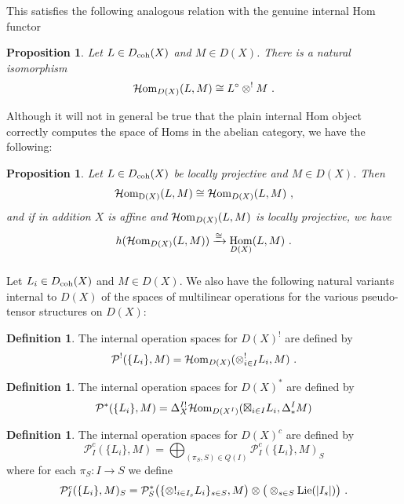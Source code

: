 \documentclass[11pt]{amsart}
\numberwithin{equation}{section}
\newtheorem{prop}[theo]{Proposition}
\theoremstyle{definition}
\newtheorem{defn}[theo]{Definition}
\newcommand{\mc}{\mathcal}
\DeclareMathOperator{\Hom}{Hom}
\newcommand{\Lie}{{\textup{Lie}}}
\newcommand{\Homi}{{\mc H\textup{om}}}
\newcommand{\coh}{{\textup{coh}}}
\newcommand{\0}{{\textbf{0}}}
\newcommand{\Dd}{{\textup{D}}}
\newcommand{\DD}{{D}}
\begin{document}
This satisfies the following analogous relation with the genuine internal Hom functor
\begin{prop}\label{inthomdescabprop} Let $L\in \DD_\coh(X)$ and $M\in \DD(X)$. There is a natural isomorphism
	\[\Homi_{\DD(X)}(L,M)  \cong L^{\circ} \otimes^! M \ . \]
\end{prop}

Although it will not in general be true that the plain internal Hom object correctly computes the space of Homs in the abelian category, we have the following:

\begin{prop}Let $L\in \DD_\coh(X)$ be locally projective and $M\in \DD(X)$. Then
	\[ \Homi_{\Dd(X)}(L,M) \cong \Homi_{\DD(X)}(L,M) \ ,\]
	and if in addition $X$ is affine and $\Homi_{\DD(X)}(L,M)$ is locally projective, we have
	\[ h(\Homi_{\DD(X)}(L,M)) \xrightarrow{\cong} \Hom_{\DD(X)}(L,M)  \ .\]
\end{prop}



\subsubsection{} Let $L_i\in \DD_\coh(X)$ and $M\in \DD(X)$. We also have the following natural variants internal to $\DD(X)$ of the spaces of multilinear operations for the various pseudo-tensor structures on $\DD(X)$: 


\begin{defn} The internal operation spaces for $\DD(X)^!$ are defined by
\[\mc P^!(\{L_i\}, M) = \Homi_{\DD(X)}(\otimes^!_{i\in I} L_i , M)  \ . \]
\end{defn}



\begin{defn} The internal operation spaces for $\DD(X)^*$ are defined by
\[ 
\mc P^*(\{L_i\}, M) = \Delta^{I!}_X\Homi_{\DD(X^I)}(\boxtimes_{i\in I} L_i , \Delta^I_* M)  \]
\end{defn}


\begin{defn} The internal operation spaces for $\DD(X)^c$ are defined by
	\begin{equation}
		\mc P^c_I(\{L_i\}, M)  = \bigoplus_{(\pi_S,S)\in Q(I)}  \mc P_I^c(\{L_i\},M)_S
	\end{equation}
	where for each $\pi_S:I\to S$ we define
	\[\mc P_I^c(\{L_i\},M)_S= \mc P_S^*\big(\{ \otimes!_{i\in I_s} L_i\}_{s\in S},M\big)\otimes \big( \otimes_{s\in S} \Lie(|I_s|)\big)  \ . \]
\end{defn}
\end{document}
